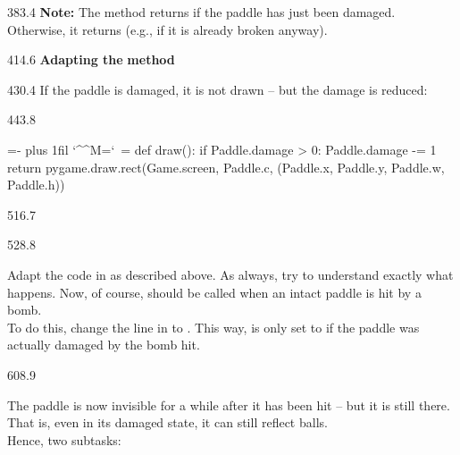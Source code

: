 \documentclass{aslab}
\makeatletter
\newcommand*\kw[1]{\textcolor{codeorange}{#1}}
\newcommand*\fn[1]{\textcolor{codecyan}{#1}}
\newcommand*\num[1]{\textcolor{codered}{#1}}
\newenvironment{pycode}{\par\ttfamily\hyphenchar\font=-1
  \lineskiplimit=-\maxdimen\lineskip=0pt\parindent=0pt
  \parfillskip=0pt plus 1fil\relax
  \catcode`\^^M=\active\catcode`\ =\active\py@setup\py@gobble}{}
\newcommand*\emo[1]{\makebox[18bp][l]{\emoji{#1}}}
\makeatother
\begin{document}
\begin{region}[pitch=13.6]{383.4}
\textbf{Note:} The method returns  if the paddle has just been
damaged. Otherwise, it returns  (e.g., if it is already broken
anyway).
\end{region}

\begin{region}{414.6}
\emo{270F}\textbf{Adapting the}  \textbf{method}
\end{region}

\begin{region}{430.4}
If the paddle is damaged, it is not drawn -- but the damage is reduced:
\end{region}

\begin{region}[]{443.8}
\begin{pycode}
    \kw{def} \fn{draw}():
        \kw{if} Paddle.damage > \num{0}:
            Paddle.damage -= \num{1}
            \kw{return}
        pygame.draw.rect(Game.screen, Paddle.c,
                         (Paddle.x, Paddle.y, Paddle.w, Paddle.h))
\end{pycode}
\end{region}

\begin{region}{516.7}
\end{region}

\begin{region}[pitch=13.38]{528.8}
\begin{tasks}
\item Adapt the code in  as described above. As always, try
  to understand exactly what happens. Now, of course, 
  should be called when an intact paddle is hit by a bomb.\\
  To do this, change the line  in  to
  . This way,  is only set to
   if the paddle was actually damaged by the bomb hit.
\end{tasks}
\end{region}

\begin{region}[pitch=13.2]{608.9}
\begin{tasks}[start=2]
\item The paddle is now invisible for a while after it has been hit -- but
  it is still there. That is, even in its damaged state, it can still
  reflect balls.\\
  Hence, two subtasks:
\end{tasks}
\end{region}
\end{document}
